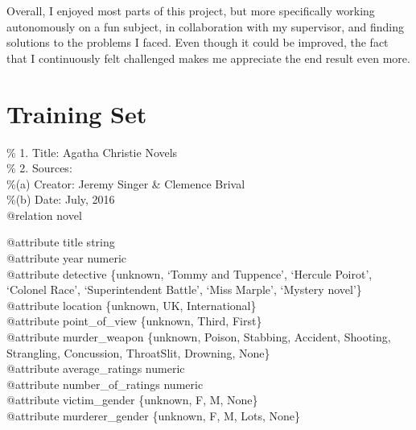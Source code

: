 \documentclass{mproj}
\begin{document}
Overall, I enjoyed most parts of this project, but more specifically working autonomously on a fun subject, in collaboration with my supervisor, and finding solutions to the problems I faced. Even though it could be improved, the fact that I continuously felt challenged makes me appreciate the end result even more.





\appendix


\chapter{Training Set}\label{dataset}

\% 1. Title: Agatha Christie Novels\\
\% 2. Sources:\\
\%\hspace{5mm}(a) Creator: Jeremy Singer \& Clemence Brival\\
\%\hspace{5mm}(b) Date: July, 2016\\
@relation novel

@attribute title string\\
@attribute year numeric\\
@attribute detective \{unknown, `Tommy and Tuppence', `Hercule Poirot', `Colonel Race', `Superintendent Battle', `Miss Marple', `Mystery novel'\}\\
@attribute location \{unknown, UK, International\}\\
@attribute point\_of\_view \{unknown, Third, First\}\\
@attribute murder\_weapon \{unknown, Poison, Stabbing, Accident, Shooting, Strangling, Concussion, ThroatSlit, Drowning, None\}\\
@attribute average\_ratings numeric\\
@attribute number\_of\_ratings numeric\\
@attribute victim\_gender \{unknown, F, M, None\}\\
@attribute murderer\_gender \{unknown, F, M, Lots, None\}
\end{document}
